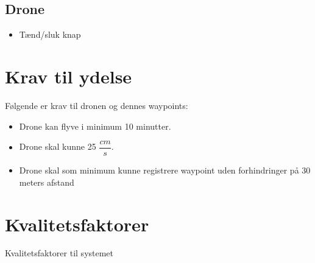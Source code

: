 \documentclass[Main]{subfiles}
\begin{document}
	
	
\subsection{Drone}

	\begin{itemize}
	\item Tænd/sluk knap
	\end{itemize}





\section{Krav til ydelse}
Følgende er krav til dronen og dennes waypoints:

	\begin{itemize}
	\item Drone kan flyve i minimum 10 minutter.
	\item Drone skal kunne 25 $\dfrac{cm}{s}$.
	\item Drone skal som minimum kunne registrere waypoint uden forhindringer på 30 meters afstand
	\end{itemize}



\section{Kvalitetsfaktorer}
Kvalitetsfaktorer til systemet
\end{document}
